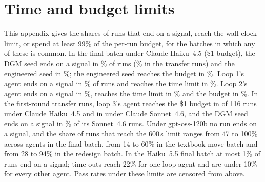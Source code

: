 

\section{Time and budget limits}\label{app:cens}
This appendix gives the shares of runs that end on a signal, reach the wall-clock limit, or spend at least 99\% of the
per-run budget, for the batches in which any of these is common. In the final batch under Claude Haiku~4.5 (\$1
budget), the DGM seed ends on a signal in \vsigKSeed\% of runs (\vsigKSeedTr\% in the transfer runs) and the
engineered seed in \vsigKStrong\%; the engineered seed reaches the budget in \vbudKStrong\%. Loop 1's agent ends on a
signal in \vsigKOne\% of runs and reaches the time limit in \vtoKOne\%. Loop 2's agent ends on a signal in
\vsigKTwo\%, reaches the time limit in \vtoKTwo\% and the budget in \vbudKTwo\%. In the first-round transfer runs,
loop 3's agent reaches the \$1 budget in \vbudTrKThreeN{} of 116 runs under Claude Haiku~4.5 and in \vbudTrSThreeN{}
under Claude Sonnet~4.6, and the DGM seed ends on a signal in \vsigSSeed\% of its Sonnet~4.6 runs. Under gpt-oss-120b
no run ends on a signal, and the share of runs that reach the 600\,s limit ranges from 47 to 100\% across agents in the
final batch, from 14 to 60\% in the textbook-move batch and from 28 to 94\% in the redesign batch. In the Haiku~5.5
final batch at most 1\% of runs end on a signal; time-outs reach 22\% for one loop agent and are under 10\% for every
other agent. Pass rates under these limits are censored from above.

